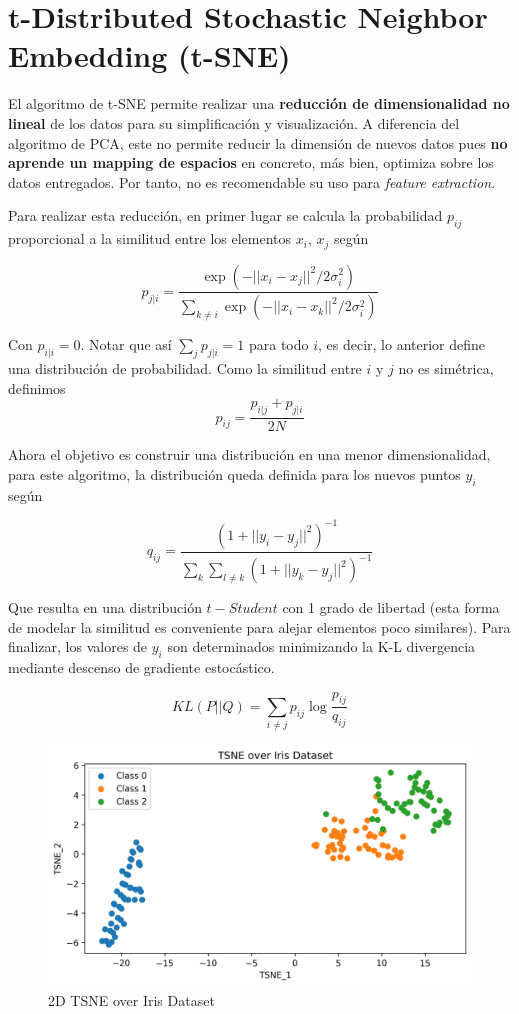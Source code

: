 \section{t-Distributed Stochastic Neighbor Embedding (t-SNE)}

El algoritmo de t-SNE permite realizar una \textbf{reducción de dimensionalidad no lineal} de los datos para su simplificación y visualización. A diferencia del algoritmo de PCA, este no permite reducir la dimensión de nuevos datos pues \textbf{no aprende un mapping de espacios} en concreto, más bien, optimiza sobre los datos entregados. Por tanto, no es recomendable su uso para \textit{feature extraction}.

Para realizar esta reducción, en primer lugar se calcula la probabilidad $p_{ij}$ proporcional a la similitud entre los elementos $x_i$, $x_j$ según 

$$
p_{j|i} = \frac{\exp(-||x_i - x_j||^2 / 2\sigma_i^2)}{\sum_{k \neq i} \exp(-||x_i - x_k||^2 / 2\sigma_i^2)}
$$

Con $p_{i|i} = 0$. Notar que así $\sum_{j}p_{j|i} = 1$ para todo $i$, es decir, lo anterior define una distribución de probabilidad. Como la similitud entre $i$ y $j$ no es simétrica, definimos 
$$
p_{ij} = \frac{p_{i|j} + p_{j|i}}{2N}
$$

Ahora el objetivo es construir una distribución en una menor dimensionalidad, para este algoritmo, la distribución queda definida para los nuevos puntos $y_i$ según 

$$ 
q_{ij} = \frac{(1 + ||y_i - y_j||^2)^{-1}}{\sum_k \sum_{l \neq k} (1 + ||y_k - y_j||^2)^{-1}}
$$

Que resulta en una distribución $t-Student$ con 1 grado de libertad (esta forma de modelar la similitud es conveniente para alejar elementos poco similares). Para finalizar, los valores de $y_i$ son determinados minimizando la K-L divergencia mediante descenso de gradiente estocástico.

$$
KL(P || Q) = \sum_{i \neq j}p_{ij}\log \frac{p_{ij}}{q_{ij}}
$$

\begin{figure}[H]
    \center
    \includegraphics[scale=0.5]{notebooks/ML/img/tsne_over_iris.png}
    \caption{2D TSNE over Iris Dataset}
\end{figure}








